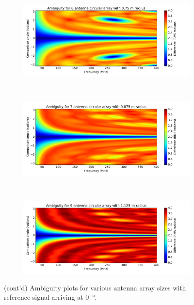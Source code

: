 \begin{figure}[H]
  \ContinuedFloat
  \centering
  \begin{subfigure}{0.95\textwidth}
    \centering
    \includegraphics[width=\textwidth, clip=true, trim = 10 15 53 0]{ambiguity06}
  \end{subfigure}\\[1em]
  \begin{subfigure}{\textwidth}
    \centering
    \includegraphics[width=\textwidth, clip=true, trim = 10 15 53 0]{ambiguity07}
  \end{subfigure}\\[1em]
  \begin{subfigure}{\textwidth}
    \centering
    \includegraphics[width=\textwidth, clip=true, trim = 10 15 53 0]{ambiguity09}
  \end{subfigure}
  \caption{(cont'd) Ambiguity plots for various antenna array sizes with reference signal arriving at \SI{0}{\degree}.}
\end{figure}

